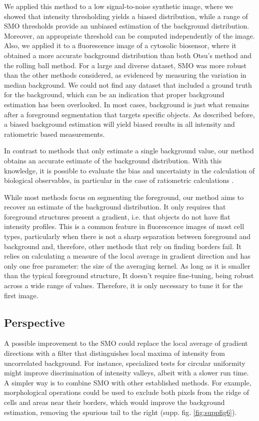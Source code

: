 \documentclass[article]{jss}
\begin{document}
	We applied this method to a low signal-to-noise synthetic image, where we showed that intensity thresholding yields a biased distribution, while a range of SMO thresholds provide an unbiased estimation of the background distribution. Moreover, an appropriate threshold can be computed independently of the image. Also, we applied it to a fluorescence image of a cytosolic biosensor, where it obtained a more accurate background distribution than both Otsu’s method and the rolling ball method. For a large and diverse dataset, SMO was more robust than the other methods considered, as evidenced by measuring the variation in median background. We could not find any dataset that included a ground truth for the background, which can be an indication that proper background estimation has been overlooked. In most cases, background is just what remains after a foreground segmentation that targets specific objects. As described before, a biased background estimation will yield biased results in all intensity and ratiometric based measurements.

	In contrast to methods that only estimate a single background value, our method obtains an accurate estimate of the background distribution. With this knowledge, it is possible to evaluate the bias and uncertainty in the calculation of biological observables, in particular in the case of ratiometric calculations \citep{Kalinin2007}.

	While most methods focus on segmenting the foreground, our method aims to recover an estimate of the background distribution. It only requires that foreground structures present a gradient, i.e. that objects do not have flat intensity profiles. This is a common feature in fluorescence images of most cell types, particularly when there is not a sharp separation between foreground and background and, therefore, other methods that rely on finding borders fail. It relies on calculating a measure of the local average in gradient direction and has only one free parameter: the size of the averaging kernel. As long as it is smaller than the typical foreground structure, It doesn’t require fine-tuning, being robust across a wide range of values. Therefore, it is only necessary to tune it for the first image.

\subsection{Perspective}

	A possible improvement to the SMO could replace the local average of gradient directions with a filter that distinguishes local maxima of intensity from uncorrelated background. For instance, specialized tests for circular uniformity \citep{Pycke2010} might improve discrimination of intensity valleys, albeit with a slower run time. A simpler way is to combine SMO with other established methods. For example, morphological operations could be used to exclude both pixels from the ridge of cells and areas near their borders, which would improve the background estimation, removing the spurious tail to the right (supp. fig. \ref{fig:suppfig6}).
\end{document}
